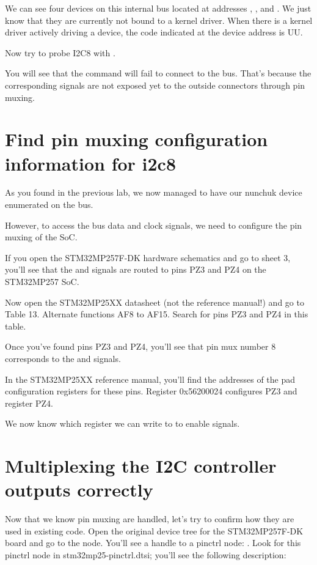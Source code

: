 We can see four devices on this internal bus located at addresses ,
,  and .
We just know that they are currently not bound to a kernel driver.
When there is a kernel driver actively driving a device,
the code indicated at the device address is UU.

Now try to probe I2C8 with .

You will see that the command will fail to connect to
the bus. That's because the corresponding signals are
not exposed yet to the outside connectors through pin muxing.

\section{Find pin muxing configuration information for i2c8}

As you found in the previous lab, we now managed to have our nunchuk
device enumerated on the  bus.

However, to access the bus data and clock signals, we need to configure
the pin muxing of the SoC.

If you open the STM32MP257F-DK hardware schematics and go to sheet 3,
you'll see that the  and  signals are routed to pins
PZ3 and PZ4 on the STM32MP257 SoC.

Now open the STM32MP25XX datasheet (not the reference manual!) and go to
Table 13. Alternate functions AF8 to AF15. Search for pins PZ3 and
PZ4 in this table.

Once you've found pins PZ3 and PZ4, you'll see that pin mux number 8
corresponds to the  and  signals.

In the STM32MP25XX reference manual, you'll find the addresses of the pad configuration
registers for these pins. Register 0x56200024 configures PZ3 and register PZ4.

We now know which register we can write to to enable 
signals.

\section{Multiplexing the I2C controller outputs correctly}

Now that we know pin muxing are handled, let's try to confirm
how they are used in existing code. Open the original device tree
for the STM32MP257F-DK board and go to the  node.
You'll see a handle to a pinctrl node: .
Look for this pinctrl node in stm32mp25-pinctrl.dtsi; you'll see the following description:

